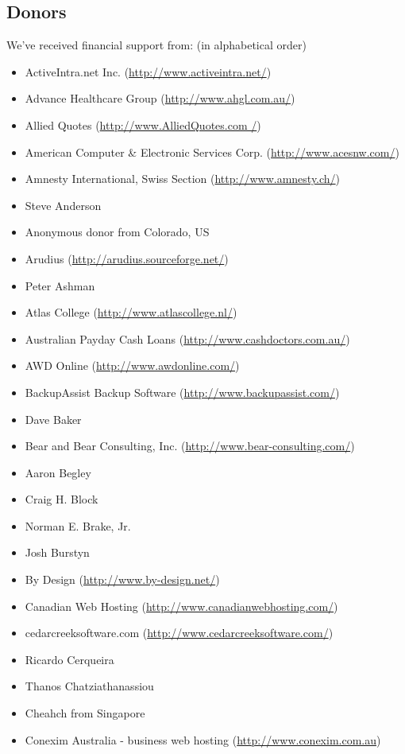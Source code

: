 \documentclass[a4paper,titlepage,12pt]{article}
\begin{document}
    \subsection{Donors}
    We've received financial support from: (in alphabetical order)
    \begin{itemize}
	\item ActiveIntra.net Inc. (\url{http://www.activeintra.net/})
	\item Advance Healthcare Group (\url{http://www.ahgl.com.au/})
	\item Allied Quotes (\url{http://www.AlliedQuotes.com /})
	\item American Computer \& Electronic Services Corp. (\url{http://www.acesnw.com/})
	\item Amnesty International, Swiss Section (\url{http://www.amnesty.ch/})
	\item Steve Anderson
	\item Anonymous donor from Colorado, US
	\item Arudius (\url{http://arudius.sourceforge.net/})
	\item Peter Ashman
	\item Atlas College (\url{http://www.atlascollege.nl/})
	\item Australian Payday Cash Loans (\url{http://www.cashdoctors.com.au/})
	\item AWD Online (\url{http://www.awdonline.com/})
	\item BackupAssist Backup Software (\url{http://www.backupassist.com/})
	\item Dave Baker
	\item Bear and Bear Consulting, Inc. (\url{http://www.bear-consulting.com/})
	\item Aaron Begley
	\item Craig H. Block
	\item Norman E. Brake, Jr.
	\item Josh Burstyn
	\item By Design (\url{http://www.by-design.net/})
	\item Canadian Web Hosting (\url{http://www.canadianwebhosting.com/})
	\item cedarcreeksoftware.com (\url{http://www.cedarcreeksoftware.com/})
	\item Ricardo Cerqueira
	\item Thanos Chatziathanassiou
	\item Cheahch from Singapore
	\item Conexim Australia - business web hosting (\url{http://www.conexim.com.au})

\end{itemize}
\end{document}
